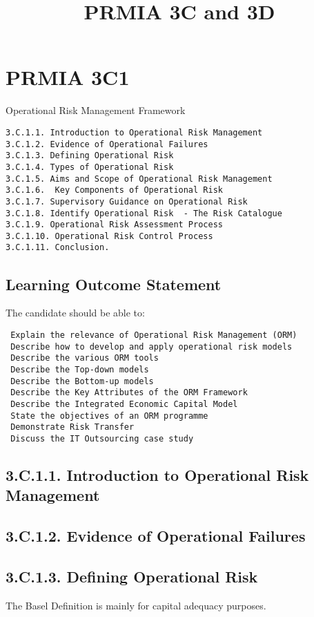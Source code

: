 \documentclass[12pt]{article}
\title{PRMIA 3C and 3D}
\begin{document}
\maketitle
\section{PRMIA 3C1}

Operational Risk Management Framework


\begin{verbatim}
3.C.1.1. Introduction to Operational Risk Management
3.C.1.2. Evidence of Operational Failures
3.C.1.3. Defining Operational Risk
3.C.1.4. Types of Operational Risk
3.C.1.5. Aims and Scope of Operational Risk Management
3.C.1.6.  Key Components of Operational Risk
3.C.1.7. Supervisory Guidance on Operational Risk
3.C.1.8. Identify Operational Risk  - The Risk Catalogue
3.C.1.9. Operational Risk Assessment Process
3.C.1.10. Operational Risk Control Process
3.C.1.11. Conclusion.
\end{verbatim}
\subsection*{Learning Outcome Statement}

The candidate should be able to:
\begin{verbatim}
 Explain the relevance of Operational Risk Management (ORM)
 Describe how to develop and apply operational risk models
 Describe the various ORM tools
 Describe the Top-down models
 Describe the Bottom-up models
 Describe the Key Attributes of the ORM Framework
 Describe the Integrated Economic Capital Model
 State the objectives of an ORM programme
 Demonstrate Risk Transfer
 Discuss the IT Outsourcing case study
\end{verbatim}


 
\subsection*{3.C.1.1. Introduction to Operational Risk Management}
\subsection*{3.C.1.2. Evidence of Operational Failures}
\subsection*{3.C.1.3. Defining Operational Risk}
The Basel Definition is mainly for capital adequacy purposes.
\end{document}
